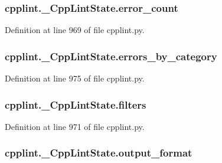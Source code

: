 \subsubsection[{\texorpdfstring{error\+\_\+count}{error_count}}]{\setlength{\rightskip}{0pt plus 5cm}cpplint.\+\_\+\+Cpp\+Lint\+State.\+error\+\_\+count}\hypertarget{classcpplint_1_1___cpp_lint_state_a4039ff9668057eff4549b99905ce753b}{}\label{classcpplint_1_1___cpp_lint_state_a4039ff9668057eff4549b99905ce753b}


Definition at line 969 of file cpplint.\+py.

\subsubsection[{\texorpdfstring{errors\+\_\+by\+\_\+category}{errors_by_category}}]{\setlength{\rightskip}{0pt plus 5cm}cpplint.\+\_\+\+Cpp\+Lint\+State.\+errors\+\_\+by\+\_\+category}\hypertarget{classcpplint_1_1___cpp_lint_state_afb33527113706b5fcae07d680d8cec99}{}\label{classcpplint_1_1___cpp_lint_state_afb33527113706b5fcae07d680d8cec99}


Definition at line 975 of file cpplint.\+py.

\subsubsection[{\texorpdfstring{filters}{filters}}]{\setlength{\rightskip}{0pt plus 5cm}cpplint.\+\_\+\+Cpp\+Lint\+State.\+filters}\hypertarget{classcpplint_1_1___cpp_lint_state_a8443105b9623383ab75fa242009c006e}{}\label{classcpplint_1_1___cpp_lint_state_a8443105b9623383ab75fa242009c006e}


Definition at line 971 of file cpplint.\+py.

\subsubsection[{\texorpdfstring{output\+\_\+format}{output_format}}]{\setlength{\rightskip}{0pt plus 5cm}cpplint.\+\_\+\+Cpp\+Lint\+State.\+output\+\_\+format}\hypertarget{classcpplint_1_1___cpp_lint_state_a5c68ca79b0ff9b2fba1c488a7b2bd3f0}{}\label{classcpplint_1_1___cpp_lint_state_a5c68ca79b0ff9b2fba1c488a7b2bd3f0}


